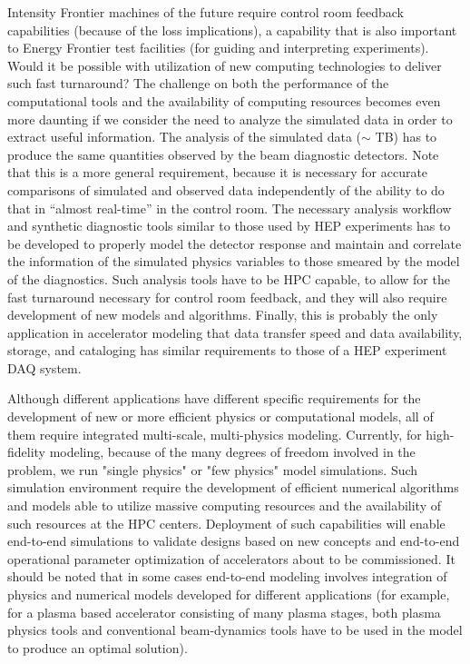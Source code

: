 Intensity Frontier machines of the future require control room
feedback capabilities (because of the loss implications), a
capability that is also important to Energy Frontier test
facilities (for guiding and interpreting experiments).   Would it
be possible with utilization of new computing technologies to
deliver such fast turnaround?  The challenge on both the
performance of the computational tools and the availability of
computing resources becomes even  more daunting if we consider
the need to analyze the simulated data in order to extract useful
information.  The analysis of the simulated data ($\sim$ TB) has
to produce the same quantities observed by the beam diagnostic
detectors.  Note that this is a more general requirement, because
it is necessary for accurate comparisons of simulated and
observed data independently of the ability to do that in ``almost
real-time'' in the control room.  The necessary analysis workflow
and synthetic diagnostic tools similar to those used by HEP
experiments has to be developed to properly model the detector
response and maintain and correlate the information of the
simulated physics variables to those smeared by the model of the
diagnostics.  Such analysis tools have to be HPC capable, to
allow for the fast turnaround necessary for control room
feedback, and they will also require development of new models
and algorithms.  Finally, this is probably the only application
in accelerator modeling that data transfer speed and data
availability, storage, and cataloging has similar requirements to
those of a HEP experiment DAQ system.

Although different applications have different specific
requirements for the development of new or more efficient physics
or computational models, all of them require integrated
multi-scale, multi-physics modeling.  Currently, for
high-fidelity modeling, because of the many degrees of freedom
involved in the problem, we run "single physics" or "few physics"
model simulations.  Such simulation environment require the
development of efficient numerical algorithms and models able to
utilize massive computing resources and the availability of such
resources at the HPC centers. Deployment of such capabilities
will enable end-to-end simulations to validate designs based on
new concepts and end-to-end operational parameter optimization of
accelerators about to be commissioned.  It should be noted that
in some cases end-to-end modeling involves integration of physics
and numerical models developed for different applications (for
example, for a plasma based accelerator consisting of many plasma
stages, both plasma physics tools and conventional beam-dynamics
tools have to be used in the model to produce an optimal
solution).

